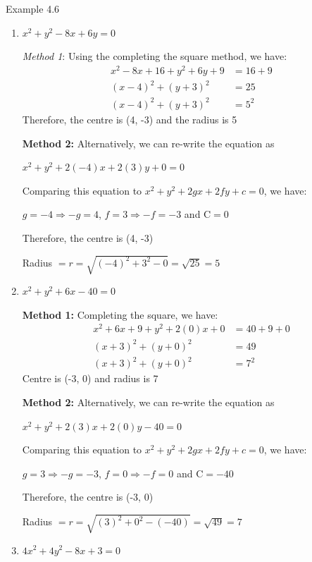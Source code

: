 \begin{example}{Example 4.6}
\begin{enumerate}
  Radius $= r = \sqrt{g^2 + f^2 - c}$

  $r = \sqrt{2^2 + 1^2 - (-4)} = \sqrt{9} = 3$

  \item[b.] $x^2 + y^2 - 8x + 6y = 0$

  \textit{Method 1}: Using the completing the square method, we have:
  \begin{align*}
  x^2 - 8x + 16 + y^2 + 6y + 9 &= 16 + 9 \\
  (x - 4)^2 + (y + 3)^2 &= 25 \\
  (x - 4)^2 + (y + 3)^2 &= 5^2
  \end{align*}
  Therefore, the centre is (4, -3) and the radius is 5

  \textbf{Method 2:} Alternatively, we can re-write the equation as

  $x^2 + y^2 + 2(-4)x + 2(3)y + 0 = 0$

  Comparing this equation to $x^2 + y^2 + 2gx + 2fy + c = 0$, we have:

  $g = -4 \Longrightarrow -g = 4$, $f = 3 \Longrightarrow -f = -3$ and C$=0$

  Therefore, the centre is (4, -3)

  Radius $= r = \sqrt{(-4)^2 + 3^2 - 0} = \sqrt{25} = 5$

  \item[c.] $x^2 + y^2 + 6x - 40 = 0$

  \textbf{Method 1:} Completing the square, we have:
  \begin{align*}
  x^2 + 6x + 9 + y^2 + 2(0)x + 0 &= 40 + 9 + 0 \\
  (x + 3)^2 + (y + 0)^2 &= 49 \\
  (x + 3)^2 + (y + 0)^2 &= 7^2
  \end{align*}
  Centre is (-3, 0) and radius is 7

  \textbf{Method 2:} Alternatively, we can re-write the equation as

  $x^2 + y^2 + 2(3)x + 2(0)y - 40 = 0$

  Comparing this equation to $x^2 + y^2 + 2gx + 2fy + c = 0$, we have:

  $g = 3 \Longrightarrow -g = -3$, $f = 0 \Longrightarrow -f = 0$ and C$= -40$

  Therefore, the centre is (-3, 0)

  Radius $= r = \sqrt{(3)^2 + 0^2 - (-40)} = \sqrt{49} = 7$

  \item[d.] $4x^2 + 4y^2 - 8x + 3 = 0$


\end{enumerate}
\end{example}
